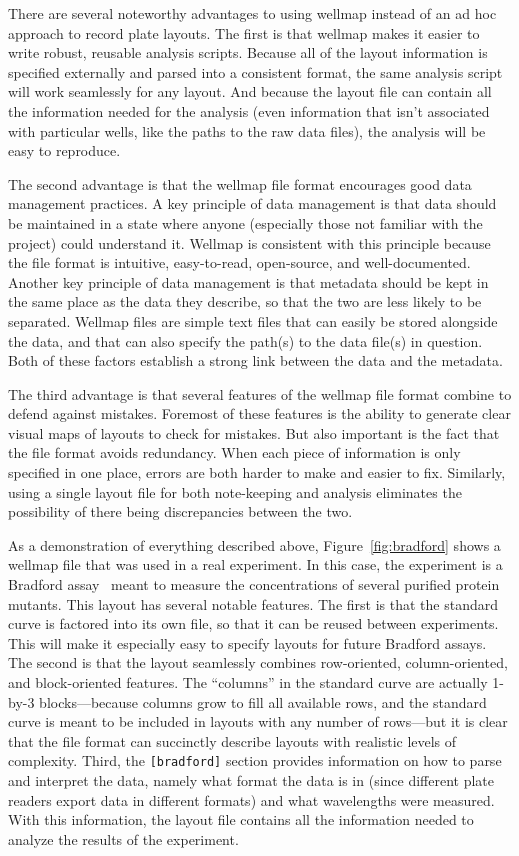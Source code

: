 \documentclass{bmcart}
\begin{document}
There are several noteworthy advantages to using wellmap instead of an ad hoc approach to record plate layouts. The first is that wellmap makes it easier to write robust, reusable analysis scripts. Because all of the layout information is specified externally and parsed into a consistent format, the same analysis script will work seamlessly for any layout. And because the layout file can contain all the information needed for the analysis (even information that isn't associated with particular wells, like the paths to the raw data files), the analysis will be easy to reproduce. 

The second advantage is that the wellmap file format encourages good data management practices. A key principle of data management is that data should be maintained in a state where anyone (especially those not familiar with the project) could understand it. Wellmap is consistent with this principle because the file format is intuitive, easy-to-read, open-source, and well-documented. Another key principle of data management is that metadata should be kept in the same place as the data they describe, so that the two are less likely to be separated. Wellmap files are simple text files that can easily be stored alongside the data, and that can also specify the path(s) to the data file(s) in question. Both of these factors establish a strong link between the data and the metadata. 

The third advantage is that several features of the wellmap file format combine to defend against mistakes. Foremost of these features is the ability to generate clear visual maps of layouts to check for mistakes. But also important is the fact that the file format avoids redundancy. When each piece of information is only specified in one place, errors are both harder to make and easier to fix. Similarly, using a single layout file for both note-keeping and analysis eliminates the possibility of there being discrepancies between the two.

As a demonstration of everything described above, Figure~\ref{fig:bradford} shows a wellmap file that was used in a real experiment. In this case, the experiment is a Bradford assay~\cite{bradford1976} meant to measure the concentrations of several purified protein mutants. This layout has several notable features. The first is that the standard curve is factored into its own file, so that it can be reused between experiments. This will make it especially easy to specify layouts for future Bradford assays. The second is that the layout seamlessly combines row-oriented, column-oriented, and block-oriented features. The ``columns'' in the standard curve are actually 1-by-3 blocks---because columns grow to fill all available rows, and the standard curve is meant to be included in layouts with any number of rows---but it is clear that the file format can succinctly describe layouts with realistic levels of complexity. Third, the \texttt{{[}bradford{]}} section provides information on how to parse and interpret the data, namely what format the data is in (since different plate readers export data in different formats) and what wavelengths were measured. With this information, the layout file contains all the information needed to analyze the results of the experiment.
\end{document}
